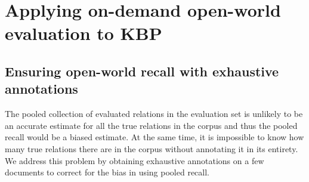 \section{Applying on-demand open-world evaluation to KBP}




\subsection{Ensuring open-world recall with exhaustive annotations}

The pooled collection of evaluated relations in the evaluation set is unlikely to be an accurate estimate for all the true relations in the corpus and thus the pooled recall would be a biased estimate.
At the same time, it is impossible to know how many true relations there are in the corpus without annotating it in its entirety.
We address this problem by obtaining exhaustive annotations on a few documents to correct for the bias in using pooled recall.


